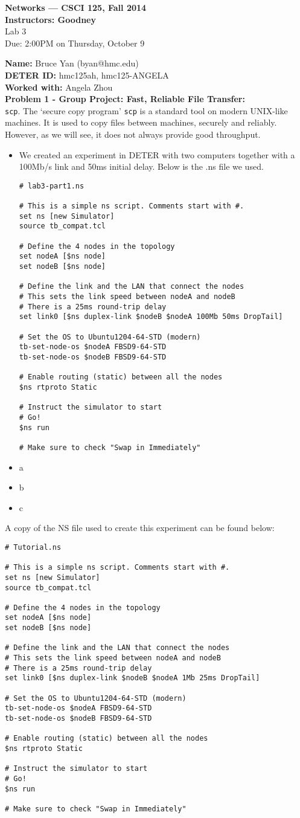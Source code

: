 \documentclass[10pt]{article}
\newcommand{\Problem}[1]{\noindent \textbf{\textbf{Problem #1:  \\ }}}
\newcommand{\Name}[1]{\noindent \textbf{Name:} #1 \\}
\newcommand{\Workedwith}[1]{\noindent \textbf{Worked with:} #1 \\}
\newcommand{\psheader}[2]{
  \begin{center}{\bf Networks --- CSCI 125, Fall 2014 \\
    Instructors: Goodney \\}
    Lab #1 \\
    Due: 2:00PM on #2
    \vspace*{.5cm}
  \end{center}
}
\newcommand{\DeterLabID}[1]{\noindent \textbf{DETER ID:} #1 \\}
\begin{document}
\psheader{3}{Thursday, October 9}


\Name{Bruce Yan (byan@hmc.edu)}
\DeterLabID{hmc125ah, hmc125-ANGELA}
\Workedwith{Angela Zhou}

\Problem{1 - Group Project: Fast, Reliable File Transfer}
\texttt{scp}. The `secure copy program' \texttt{scp} is a standard tool on modern UNIX-like machines. It is used to copy files between machines, securely and reliably. However, as we will see, it does not always provide good throughput.
\begin{itemize}
\itemsep0em
\item We created an experiment in DETER with two computers together with a 100Mb/s link and 50ms initial delay.  Below is the .ns file we used.
\begin{lstlisting}
# lab3-part1.ns

# This is a simple ns script. Comments start with #.
set ns [new Simulator]
source tb_compat.tcl

# Define the 4 nodes in the topology
set nodeA [$ns node]
set nodeB [$ns node]

# Define the link and the LAN that connect the nodes
# This sets the link speed between nodeA and nodeB
# There is a 25ms round-trip delay
set link0 [$ns duplex-link $nodeB $nodeA 100Mb 50ms DropTail]

# Set the OS to Ubuntu1204-64-STD (modern)
tb-set-node-os $nodeA FBSD9-64-STD
tb-set-node-os $nodeB FBSD9-64-STD

# Enable routing (static) between all the nodes
$ns rtproto Static

# Instruct the simulator to start
# Go!
$ns run

# Make sure to check "Swap in Immediately"
\end{lstlisting}
\item a
\item b
\item c
\end{itemize}


A copy of the NS file used to create this experiment can be found below:
\begin{lstlisting}
# Tutorial.ns

# This is a simple ns script. Comments start with #.
set ns [new Simulator]
source tb_compat.tcl

# Define the 4 nodes in the topology
set nodeA [$ns node]
set nodeB [$ns node]

# Define the link and the LAN that connect the nodes
# This sets the link speed between nodeA and nodeB
# There is a 25ms round-trip delay
set link0 [$ns duplex-link $nodeB $nodeA 1Mb 25ms DropTail]

# Set the OS to Ubuntu1204-64-STD (modern)
tb-set-node-os $nodeA FBSD9-64-STD
tb-set-node-os $nodeB FBSD9-64-STD

# Enable routing (static) between all the nodes
$ns rtproto Static

# Instruct the simulator to start
# Go!
$ns run

# Make sure to check "Swap in Immediately"
\end{lstlisting}
\newpage
\end{document}
